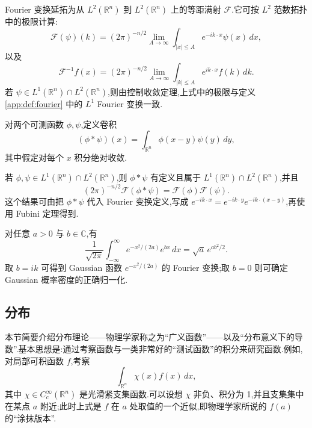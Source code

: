 \begin{theorem}\label{app:thm:plancherel-II}
Fourier 变换延拓为从 \(L^2(\mathbb R^n)\) 到 \(L^2(\mathbb R^n)\) 上的等距满射 \(\mathcal F\).它可按 \(L^2\) 范数拓扑中的极限计算:
\[
\mathcal F(\psi)(k)=(2\pi)^{-n/2}\lim_{A\to\infty}\int_{|x|\le A}e^{-ik\cdot x}\psi(x)\,dx,\tag{A.3}
\]
以及
\[
\mathcal F^{-1}f(x)=(2\pi)^{-n/2}\lim_{A\to\infty}\int_{|k|\le A}e^{ik\cdot x}f(k)\,dk.
\]
若 \(\psi\in L^1(\mathbb R^n)\cap L^2(\mathbb R^n)\),则由控制收敛定理,上式中的极限与定义 \ref{app:def:fourier} 中的 \(L^1\) Fourier 变换一致.
\end{theorem}

\begin{definition}[卷积]\label{app:def:convolution}
对两个可测函数 \(\phi,\psi\),定义卷积
\[
(\phi*\psi)(x)=\int_{\mathbb R^n}\phi(x-y)\psi(y)\,dy,
\]
其中假定对每个 \(x\) 积分绝对收敛.
\end{definition}

\begin{proposition}\label{app:prop:convolution-fourier}
若 \(\phi,\psi\in L^1(\mathbb R^n)\cap L^2(\mathbb R^n)\),则 \(\phi*\psi\) 有定义且属于 \(L^1(\mathbb R^n)\cap L^2(\mathbb R^n)\),并且
\[
(2\pi)^{-n/2}\mathcal F(\phi*\psi)=\mathcal F(\phi)\mathcal F(\psi).
\]
这个结果可由把 \(\phi*\psi\) 代入 Fourier 变换定义,写成 \(e^{-ik\cdot x}=e^{-ik\cdot y}e^{-ik\cdot(x-y)}\),再使用 Fubini 定理得到.
\end{proposition}

\begin{proposition}[Gaussian 积分]\label{app:prop:gaussian}
对任意 \(a>0\) 与 \(b\in\mathbb C\),有
\[
\frac1{\sqrt{2\pi}}\int_{-\infty}^{\infty}e^{-x^2/(2a)}e^{bx}\,dx
=\sqrt a\,e^{ab^2/2}.
\]
取 \(b=ik\) 可得到 Gaussian 函数 \(e^{-x^2/(2a)}\) 的 Fourier 变换;取 \(b=0\) 则可确定 Gaussian 概率密度的正确归一化.
\end{proposition}

\subsection{分布}

本节简要介绍分布理论——物理学家称之为“广义函数”——以及“分布意义下的导数”.基本思想是:通过考察函数与一类非常好的“测试函数”的积分来研究函数.例如,对局部可积函数 \(f\),考察
\[
\int_{\mathbb R^n}\chi(x)f(x)\,dx,\tag{A.4}
\]
其中 \(\chi\in C_c^\infty(\mathbb R^n)\) 是光滑紧支集函数.可以设想 \(\chi\) 非负、积分为 1,并且支集集中在某点 \(a\) 附近;此时上式是 \(f\) 在 \(a\) 处取值的一个近似,即物理学家所说的 \(f(a)\) 的“涂抹版本”.

